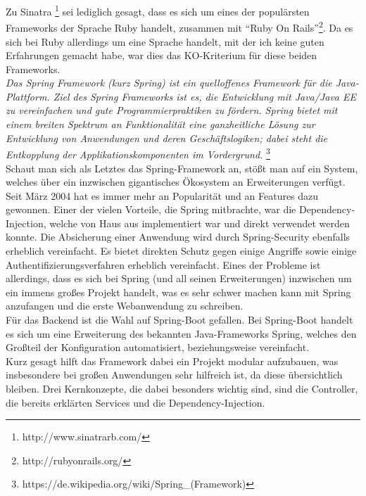 Zu Sinatra \footnote{http://www.sinatrarb.com/} sei lediglich gesagt, dass es sich um eines der populärsten Frameworks der Sprache Ruby handelt, zusammen mit ``Ruby On Rails''\footnote{http://rubyonrails.org/}. Da es sich bei Ruby allerdings um eine Sprache handelt, mit der ich keine guten Erfahrungen gemacht habe, war dies das KO-Kriterium für diese beiden Frameworks. \\

\emph{\glqq   
Das Spring Framework (kurz Spring) ist ein quelloffenes Framework für die Java-Plattform. Ziel des Spring Frameworks ist es, die Entwicklung mit Java/Java EE zu vereinfachen und gute Programmierpraktiken zu fördern. Spring bietet mit einem breiten Spektrum an Funktionalität eine ganzheitliche Lösung zur Entwicklung von Anwendungen und deren Geschäftslogiken; dabei steht die Entkopplung der Applikationskomponenten im Vordergrund.
\grqq} \footnote{https://de.wikipedia.org/wiki/Spring\_(Framework)} \\

Schaut man sich als Letztes das Spring-Framework an, stößt man auf ein System, welches über ein inzwischen gigantisches Ökosystem an Erweiterungen verfügt. Seit März 2004 hat es immer mehr an Popularität und an Features dazu gewonnen. Einer der vielen Vorteile, die Spring mitbrachte, war die Dependency-Injection, welche von Haus aus implementiert war und direkt verwendet werden konnte. Die Absicherung einer Anwendung wird durch Spring-Security ebenfalls erheblich vereinfacht. Es bietet direkten Schutz gegen einige Angriffe sowie einige Authentifizierungsverfahren erheblich vereinfacht.  Eines der Probleme ist allerdings, dass es sich bei Spring (und all seinen Erweiterungen) inzwischen um ein immens großes Projekt handelt, was es sehr schwer machen kann mit Spring anzufangen und die erste Webanwendung zu schreiben. \\

Für das Backend ist die Wahl auf Spring-Boot gefallen. Bei Spring-Boot handelt es sich um eine Erweiterung des bekannten Java-Frameworks Spring, welches den Großteil der Konfiguration automatisiert, beziehungsweise vereinfacht.\\
Kurz gesagt hilft das Framework dabei ein Projekt modular aufzubauen, was insbesondere bei großen Anwendungen sehr hilfreich ist, da diese übersichtlich bleiben. Drei Kernkonzepte, die dabei besonders wichtig sind, sind die Controller, die bereits erklärten Services und die Dependency-Injection. \\

